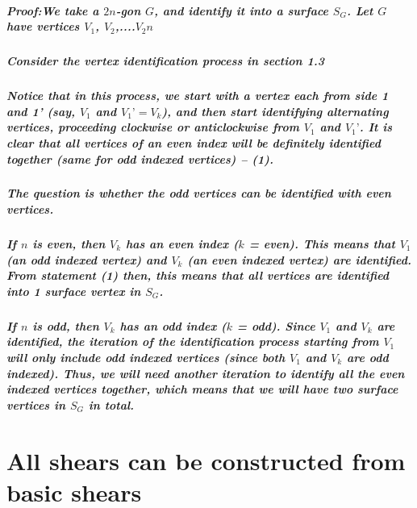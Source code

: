 \documentclass{report}
\begin{document}
\paragraph{\textit{Proof}:We take a $2n$-gon $G$, and identify it into a surface $S_G$. Let $G$ have vertices $V_1$, $V_2$,....$V_2n$}

\paragraph{Consider the vertex identification process in section 1.3}

\paragraph{Notice that in this process, we start with a vertex each from side 1 and 1’ (say, $V_1$ and $V_1’ = V_k$), and then start identifying alternating vertices, proceeding clockwise or anticlockwise from $V_1$ and $V_1’$. It is clear that all vertices of an even index will be definitely identified together (same for odd indexed vertices) -- (1).}

\paragraph{The question is whether the odd vertices can be identified with even vertices.}

\paragraph{If $n$ is even, then $V_k$ has an even index ($k$ = even). This means that $V_1$ (an odd indexed vertex) and $V_k$ (an even indexed vertex) are identified. From statement (1) then, this means that all vertices are identified into 1 surface vertex in $S_G$.}

\paragraph{If $n$ is odd, then $V_k$ has an odd index ($k$ = odd). Since $V_1$ and $V_k$ are identified, the iteration of the identification process starting from $V_1$ will only include odd indexed vertices (since both $V_1$ and $V_k$ are odd indexed). Thus, we will need another iteration to identify all the even indexed vertices together, which means that we will have two surface vertices in $S_G$ in total.}



\chapter{All shears can be constructed from basic shears}
\end{document}
